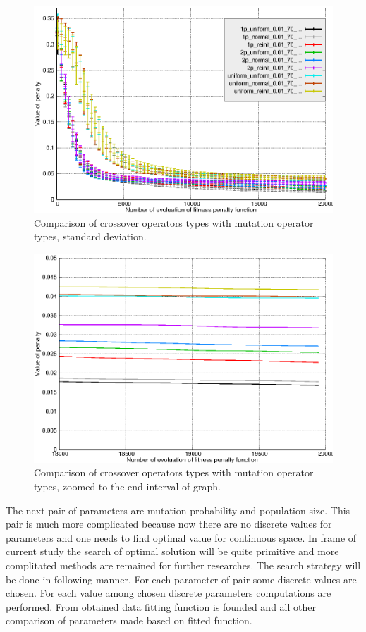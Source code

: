 \documentclass[12pt]{report}
\begin{document}
\begin{figure}
    \centering
    \includegraphics[width=5.0in]{operators_comparison_err}
    \caption{Comparison of crossover operators types with mutation operator types, standard deviation.}
    \label{operatorcomparisonerr}
\end{figure}

\begin{figure}
    \centering
    \includegraphics[width=5.0in]{operators_comparison_zoom}
    \caption{Comparison of crossover operators types with mutation operator types, zoomed to the end interval of graph.}
    \label{operatorcomparisonzoom}
\end{figure}

The next pair of parameters are mutation probability and population size. This pair is much more complicated because now there are no discrete values for parameters and one needs to find optimal value for continuous space. In frame of current study the search of optimal solution will be quite primitive and more complitated methods are remained for further researches. The search strategy will be done in following manner. For each parameter of pair some discrete values are chosen. For each value among chosen discrete parameters computations are performed. From obtained data fitting function is founded and all other comparison of parameters made based on fitted function.
\end{document}
